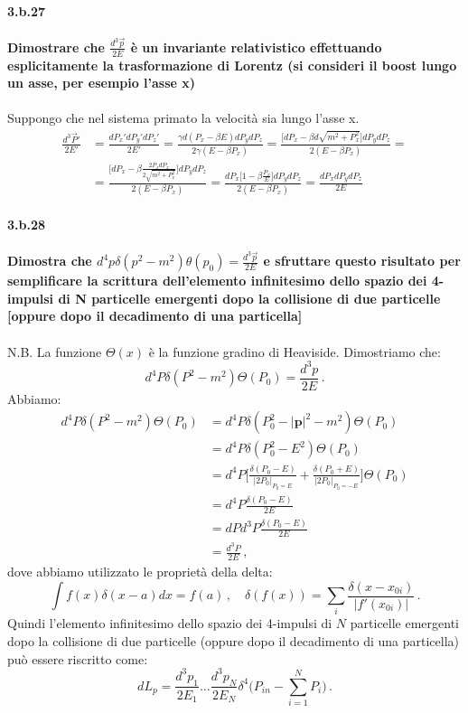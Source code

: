 \documentclass[twoside]{article}
\begin{document}
\paragraph{3.b.27}\textbf{Dimostrare che $\frac{d^3\vec{p}}{2E}$ è un invariante relativistico effettuando esplicitamente la
trasformazione di Lorentz (si consideri il boost lungo un asse, per esempio l'asse
x)}\\\\
Suppongo che nel sistema primato la velocità sia lungo l'asse x.
\begin{align}
    \frac{d^3\vec{P}'}{2E'}&=\frac{dP_x'dP_y'dP_z'}{2E'}=\frac{\gamma d(P_x-\beta E)dP_ydP_z}{2\gamma(E-\beta P_x)}=\frac{\biggl[dP_x-\beta d\sqrt{m^2+P_x^2}\biggr]dP_ydP_z}{2(E-\beta P_x)}=\\
    &=\frac{\biggl[dP_x-\beta \frac{2P_xdP_x}{2\sqrt{m^2+P_x^2}}\biggr]dP_ydP_z}{2(E-\beta P_x)}=\frac{dP_x\biggl[1-\beta \frac{P_x}{E}\biggr]dP_ydP_z}{2(E-\beta P_x)}=\frac{dP_xdP_ydP_z}{2E}
\end{align}

\paragraph{3.b.28}\textbf{Dimostra che $d^4p\delta(p^2-m^2)\theta(p_0)=\frac{d^3\vec{p}}{2E}$ e sfruttare questo risultato per semplificare la scrittura dell'elemento infinitesimo dello spazio dei 4-impulsi di N particelle emergenti dopo la collisione di due particelle [oppure dopo il decadimento di una particella]}\\
\\
N.B. La funzione $\Theta(x)$ è la funzione gradino di Heaviside.
Dimostriamo che:
\begin{equation}
d^4P \delta(P^2-m^2)\Theta(P_0)=\frac{d^3p}{2E} \, .
\end{equation}
Abbiamo:
\begin{align*}
d^4P \delta(P^2-m^2)\Theta(P_0) &= d^4P \delta(P_0^2-|\mathbf{p}|^2-m^2)\Theta(P_0) \\
&=d^4P \delta(P_0^2-E^2)\Theta(P_0) \\
&=d^4P \biggl[\frac{\delta (P_0-E)}{|2P_0|_{P_0=E}}+\frac{\delta(P_0+E)}{|2P_0|_{P_0=-E}} \biggr]\Theta(P_0) \\
&=d^4P \frac{\delta (P_0-E)}{2E} \\
&=dP  d^3P \frac{\delta (P_0-E)}{2E} \\
&=\frac{d^3P}{2E} \, ,
\end{align*}
dove abbiamo utilizzato le proprietà della delta:
\begin{equation}
\int f(x)\delta(x-a)dx=f(a) \, , \quad \delta(f(x))=\sum\limits _i \frac{\delta(x-x_{0i})}{|f'(x_{0i})|} \, .
\end{equation}
Quindi l'elemento infinitesimo dello spazio dei 4-impulsi di $N$ particelle emergenti dopo la collisione di due particelle (oppure dopo il decadimento di una particella) può essere riscritto come:
\begin{equation}
dL_p=\frac{d^3p_1}{2E_1}\dots \frac{d^3p_N}{2E_N} \delta^4 \biggl( P_{in}-\sum\limits_{i=1}^N P_i \biggr) \, .
\end{equation}
\end{document}
